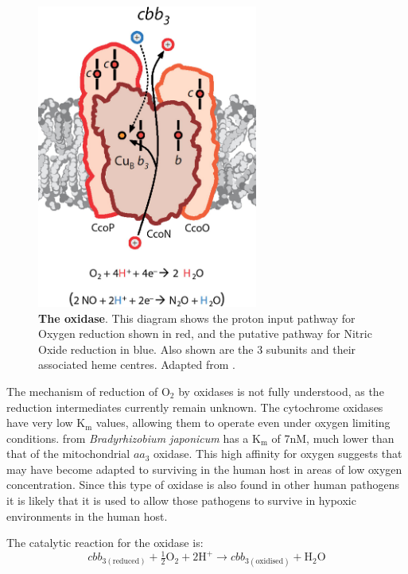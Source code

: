 \begin{figure}[tbp]
	\begin{center}
		\includegraphics[height=10cm]{01-introduction/data/cbb3_only.png}
	\end{center}
	\caption[{\bf The \cbbthree{} oxidase}.]{{\bf The \cbbthree{} oxidase}. This diagram shows the proton input pathway for Oxygen reduction shown in red, and the putative pathway for Nitric Oxide reduction in blue. Also shown are the 3 subunits and their associated heme centres. Adapted from \citet{Huang2010}.
	\label{fig:cbb3}}
\end{figure}

The mechanism of reduction of $\mathrm{O}_2$ by \cbbthree{} oxidases is not fully understood, as the reduction intermediates currently remain unknown\cite{Huang2010}. The cytochrome \cbbthree{} oxidases have very low $\mathrm{K}_\mathrm{m}$ values, allowing them to operate even under oxygen limiting conditions. \cbbthree{} from \textit{Bradyrhizobium japonicum} has a $\mathrm{K}_\mathrm{m}$ of 7nM, much lower than that of the mitochondrial $aa_3$ oxidase\cite{Zufferey1996}. This high affinity for oxygen suggests that \Nm{} may have become adapted to surviving in the human host in areas of low oxygen concentration. Since this type of oxidase is also found in other human pathogens it is likely that it is used to allow those pathogens to survive in hypoxic environments in the human host\cite{Preisig1996a}.

The catalytic reaction for the \cbbthree{} oxidase is:
\begin{equation}
cbb_{3\mathrm{(reduced)}} + \tfrac{1}{2}\mathrm{O}_2 + 2\mathrm{H}^+ \rightarrow cbb_{3\mathrm{(oxidised)}} + \mathrm{H}_2\mathrm{O}
\end{equation}

